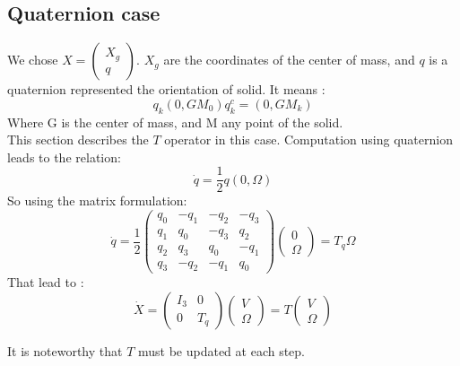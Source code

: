 \subsection{Quaternion case}
We chose $X= \left(\begin{array}{l} X_g \\q \end{array}\right) $. $X_g$ are the coordinates of the center of mass, and $q$ is a quaternion
  represented the orientation of solid. It means :
  \[q_k(0,GM_0)q_k^c = (0,GM_k)\]
Where G is the center of mass, and M any point of the solid.\\
This section describes the $T$ operator in this case. Computation using quaternion leads to the relation:
\[\dot q = \frac{1}{2} q (0,\Omega)\]
So using the matrix formulation:
\[\dot q = \frac{1}{2}  \left(\begin{array}{cccc} q_0&-q_1&-q_2&-q_3 \\ q_1&q_0&-q_3&q_2\\
  q_2&q_3&q_0&-q_1\\ q_3&-q_2&-q_1&q_0\end{array}\right)  \left(\begin{array}{c} 0 \\ \Omega
  \end{array}\right) =
  T_q   \Omega  \]
  That lead to :
  \[ \dot X = \left(\begin{array}{cc} I_3 & 0 \\ 0 &
  T_q \end{array}\right) \left(\begin{array}{c} V\\ \Omega  \end{array}\right)  = T \left(\begin{array}{c} V\\ \Omega  \end{array}\right)\]

It is noteworthy that $T$ must be updated at each step.

